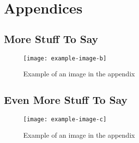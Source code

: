 \pagestyle{appendix}
\appendix
\section*{Appendices}
\renewcommand{\thesubsection}{\Alph{subsection}}

\lipsum[2]

\subsection{More Stuff To Say}

\begin{figure}[H]
    \centering
    \texttt{[image: example-image-b]}
    \caption{Example of an image in the appendix}
    \label{fig:appendix_a}
\end{figure}

\newpage    %

\subsection{Even More Stuff To Say}

\lipsum[3]

\begin{figure}[H]
    \centering
    \texttt{[image: example-image-c]}
    \caption{Example of an image in the appendix}
    \label{fig:appendix_b}
\end{figure}